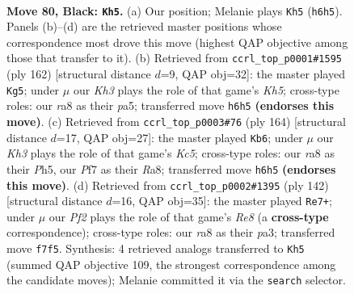 \documentclass[11pt]{article}
\begin{document}
\clearpage

\begin{figure}[p]\centering
\begin{subfigure}{0.46\textwidth}\centering
\resizebox{\linewidth}{!}{%
\newchessgame
\chessboard[
  setfen={R7/2r2p2/1R2p2k/8/P3P3/5P1K/8/8 b - - 52 80},
  showmover=false,
  pgfstyle=straightmove, color=movearrow, markmove={h6-h5}
]}
\caption{}
\end{subfigure}\hfill
\begin{subfigure}{0.46\textwidth}\centering
\resizebox{\linewidth}{!}{%
\newchessgame
\chessboard[
  setfen={8/6k1/3p4/pr1P3K/4PR2/8/8/8 w - - 0 82},
  showmover=false,
  pgfstyle=straightmove, color=movearrow, markmove={h5-g5}
]}
\caption{}
\end{subfigure}
\\[4pt]
\begin{subfigure}{0.46\textwidth}\centering
\resizebox{\linewidth}{!}{%
\newchessgame
\chessboard[
  setfen={R7/P4kp1/7p/2K4P/8/8/r7/8 w - - 7 83},
  showmover=false,
  pgfstyle=straightmove, color=movearrow, markmove={c5-b6}
]}
\caption{}
\end{subfigure}\hfill
\begin{subfigure}{0.46\textwidth}\centering
\resizebox{\linewidth}{!}{%
\newchessgame
\chessboard[
  setfen={4R3/1k6/2p5/8/3PP3/p5K1/4r2P/8 w - - 5 72},
  showmover=false,
  pgfstyle=straightmove, color=movearrow, markmove={e8-e7}
]}
\caption{}
\end{subfigure}
\caption{\textbf{Move 80, Black: \texttt{Kh5}.} (a) Our position; Melanie plays \texttt{Kh5} (\texttt{h6h5}). Panels (b)--(d) are the retrieved master positions whose correspondence most drove this move (highest QAP objective among those that transfer to it). (b) Retrieved from \texttt{ccrl\_top\_p0001\#1595} (ply 162) [structural distance $d$=9, QAP obj=32]: the master played \texttt{Kg5}; under $\mu$ our \emph{Kh3} plays the role of that game's \emph{Kh5}; cross-type roles: our \emph{r}a8 as their \emph{p}a5; transferred move \texttt{h6h5} \textbf{(endorses this move)}. (c) Retrieved from \texttt{ccrl\_top\_p0003\#76} (ply 164) [structural distance $d$=17, QAP obj=27]: the master played \texttt{Kb6}; under $\mu$ our \emph{Kh3} plays the role of that game's \emph{Kc5}; cross-type roles: our \emph{r}a8 as their \emph{P}h5, our \emph{P}f7 as their \emph{R}a8; transferred move \texttt{h6h5} \textbf{(endorses this move)}. (d) Retrieved from \texttt{ccrl\_top\_p0002\#1395} (ply 142) [structural distance $d$=16, QAP obj=35]: the master played \texttt{Re7+}; under $\mu$ our \emph{Pf2} plays the role of that game's \emph{Re8} (a \textbf{cross-type} correspondence); cross-type roles: our \emph{r}a8 as their \emph{p}a3; transferred move \texttt{f7f5}. Synthesis: 4 retrieved analogs transferred to \texttt{Kh5} (summed QAP objective 109, the strongest correspondence among the candidate moves); Melanie committed it via the \texttt{search} selector.}
\label{fig:thought-m159}
\end{figure}
\end{document}
